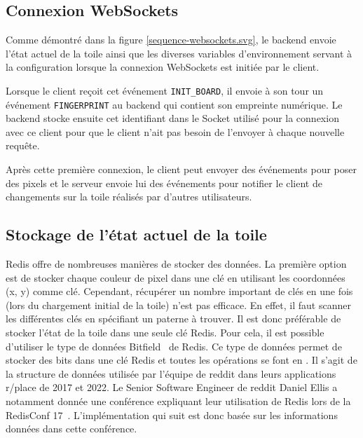 \subsection{Connexion WebSockets}
\label{section:connexion-websockets}


Comme démontré dans la figure \ref{sequence-websockets.svg}, le backend envoie l'état actuel de la toile ainsi que les diverses variables d'environnement servant à la configuration lorsque la connexion WebSockets est initiée par le client.

Lorsque le client reçoit cet événement \texttt{INIT\_BOARD}, il envoie à son tour un événement \texttt{FINGERPRINT} au backend qui contient son empreinte numérique. Le backend stocke ensuite cet identifiant dans le Socket utilisé pour la connexion avec ce client pour que le client n'ait pas besoin de l'envoyer à chaque nouvelle requête.

Après cette première connexion, le client peut envoyer des événements pour poser des pixels et le serveur envoie lui des événements pour notifier le client de changements sur la toile réalisés par d'autres utilisateurs.

\subsection{Stockage de l'état actuel de la toile}
\label{section:stockage}

Redis offre de nombreuses manières de stocker des données. La première option est de stocker chaque couleur de pixel dans une clé en utilisant les coordonnées (x, y) comme clé. Cependant, récupérer un nombre important de clés en une fois (lors du chargement initial de la toile) n'est pas efficace. En effet, il faut scanner les différentes clés en spécifiant un paterne à trouver. Il est donc préférable de stocker l'état de la toile dans une seule clé Redis. Pour cela, il est possible d'utiliser le type de données Bitfield~\cite{bitfield} de Redis. Ce type de données permet de stocker des bits dans une clé Redis et toutes les opérations se font en . Il s'agit de la structure de données utilisée par l'équipe de \gls{reddit} dans leurs applications r/place de 2017 et 2022. Le Senior Software Engineer de \gls{reddit} Daniel Ellis a notamment donnée une conférence expliquant leur utilisation de Redis lors de la RedisConf 17~\cite{redisconf}. L'implémentation qui suit est donc basée sur les informations données dans cette conférence.

